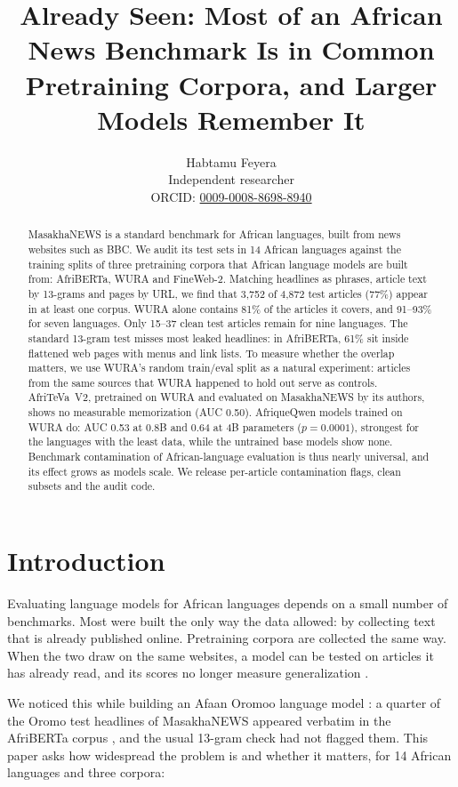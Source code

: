 \documentclass[11pt]{article}
\title{Already Seen: Most of an African News Benchmark Is in Common\\Pretraining Corpora, and Larger Models Remember It}
\author{Habtamu Feyera \\
  Independent researcher \\
  ORCID: \href{https://orcid.org/0009-0008-8698-8940}{0009-0008-8698-8940}
}
\begin{document}
\maketitle

\begin{abstract}
MasakhaNEWS is a standard benchmark for African languages, built from news websites such as BBC. We audit its test sets in 14 African languages against the training splits of three pretraining corpora that African language models are built from: AfriBERTa, WURA and FineWeb-2. Matching headlines as phrases, article text by 13-grams and pages by URL, we find that 3,752 of 4,872 test articles (77\%) appear in at least one corpus. WURA alone contains 81\% of the articles it covers, and 91--93\% for seven languages. Only 15--37 clean test articles remain for nine languages. The standard 13-gram test misses most leaked headlines: in AfriBERTa, 61\% sit inside flattened web pages with menus and link lists. To measure whether the overlap matters, we use WURA's random train/eval split as a natural experiment: articles from the same sources that WURA happened to hold out serve as controls. AfriTeVa~V2, pretrained on WURA and evaluated on MasakhaNEWS by its authors, shows no measurable memorization (AUC 0.50). AfriqueQwen models trained on WURA do: AUC 0.53 at 0.8B and 0.64 at 4B parameters ($p = 0.0001$), strongest for the languages with the least data, while the untrained base models show none. Benchmark contamination of African-language evaluation is thus nearly universal, and its effect grows as models scale. We release per-article contamination flags, clean subsets and the audit code.
\end{abstract}

\section{Introduction}

Evaluating language models for African languages depends on a small number of benchmarks. Most were built the only way the data allowed: by collecting text that is already published online. Pretraining corpora are collected the same way. When the two draw on the same websites, a model can be tested on articles it has already read, and its scores no longer measure generalization \citep{sainz2023trouble,magar2022contamination}.

We noticed this while building an Afaan Oromoo language model \citep{feyera2026oromo}: a quarter of the Oromo test headlines of MasakhaNEWS \citep{adelani2023masakhanews} appeared verbatim in the AfriBERTa corpus \citep{ogueji2021afriberta}, and the usual 13-gram check \citep{brown2020gpt3} had not flagged them. This paper asks how widespread the problem is and whether it matters, for 14 African languages and three corpora:
\end{document}

